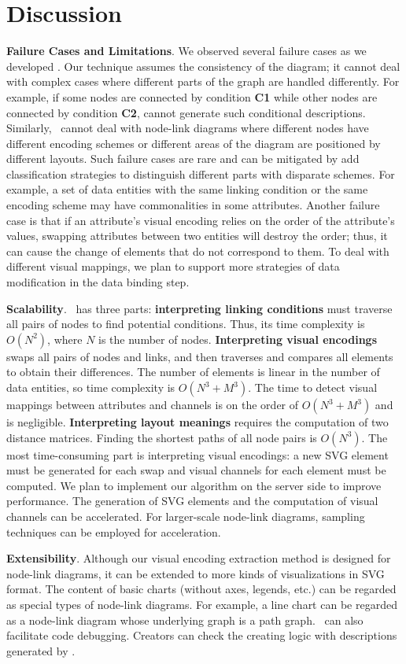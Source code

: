 \section{Discussion}
\textbf{Failure Cases and Limitations}.
We observed several failure cases as we developed \ApproachName.
Our technique assumes the consistency of the diagram;
it cannot deal with complex cases where different parts of the graph are handled differently.
For example, if some nodes are connected by condition \textbf{C1} while other nodes are connected by condition \textbf{C2}, \ApproachName cannot generate such conditional descriptions.
Similarly, \ApproachName~cannot deal with node-link diagrams where different nodes have different encoding schemes or different areas of the diagram are positioned by different layouts.
Such failure cases are rare and can be mitigated by add classification strategies to distinguish different parts with disparate schemes.
For example, a set of data entities with the same linking condition or the same encoding scheme may have commonalities in some attributes.
Another failure case is that if an attribute's visual encoding relies on the order of the attribute's values, swapping attributes between two entities will destroy the order; thus, it can cause the change of elements that do not correspond to them.
To deal with different visual mappings, we plan to support more strategies of data modification in the data binding step.

\textbf{Scalability}.
\ApproachName~has three parts:
\textbf{interpreting linking conditions} must traverse all pairs of nodes to find potential conditions.
Thus, its time complexity is $O(N^2)$, where $N$ is the number of nodes.
\textbf{Interpreting visual encodings} swaps all pairs of nodes and links, and then traverses and compares all elements to obtain their differences.
The number of elements is linear in the number of data entities, so time complexity is $O(N^3 + M^3)$.
The time to detect visual mappings between attributes and channels is on the order of $O(N^3 + M^3)$ and is negligible.
\textbf{Interpreting layout meanings} requires the computation of two distance matrices.
Finding the shortest paths of all node pairs is $O(N^3)$.
The most time-consuming part is interpreting visual encodings:
a new SVG element must be generated for each swap and visual channels for each element must be computed.
We plan to implement our algorithm on the server side to improve performance.
The generation of SVG elements and the computation of visual channels can be accelerated.
For larger-scale node-link diagrams, sampling techniques can be employed for acceleration.

\textbf{Extensibility}.
Although our visual encoding extraction method is designed for node-link diagrams, it can be extended to more kinds of visualizations in SVG format.
The content of basic charts (without axes, legends, etc.) can be regarded as special types of node-link diagrams.
For example, a line chart can be regarded as a node-link diagram whose underlying graph is a path graph.
\ApproachName~can  also facilitate code debugging.
Creators can check the creating logic with descriptions generated by \ApproachName.